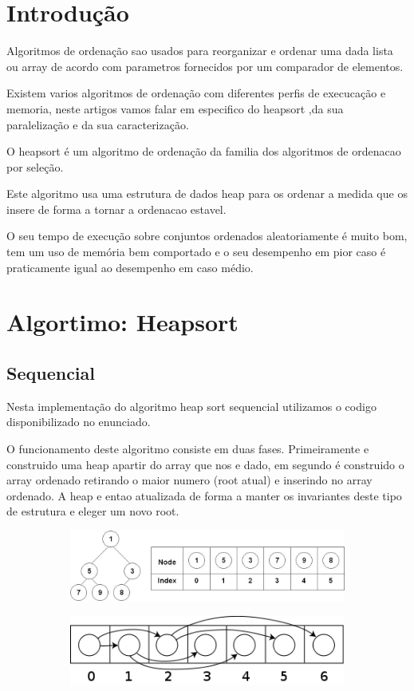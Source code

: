 \documentclass{article}
\begin{document}
\section{Introdução} 
\par Algoritmos de ordenação sao usados para reorganizar e ordenar uma dada lista ou array de acordo com parametros fornecidos por um comparador de elementos.
\par Existem varios algoritmos de ordenação com diferentes perfis de execucação e memoria, neste artigos vamos falar em especifico do heapsort ,da sua paralelização e da sua caracterização.
\par O heapsort é um algoritmo de ordenação da familia dos algoritmos de ordenacao por seleção. 
\par Este algoritmo usa uma estrutura de dados heap para os ordenar a medida que os insere de forma a tornar a ordenacao estavel. 
\par O seu tempo de execução sobre conjuntos ordenados aleatoriamente é muito bom, tem um uso de memória bem comportado e o seu desempenho em pior caso é praticamente igual ao desempenho em caso médio.

\section{Algortimo: Heapsort} 

\subsection{Sequencial}
Nesta implementação do algoritmo heap sort sequencial utilizamos o codigo disponibilizado no enunciado. 
\par  O funcionamento deste algoritmo consiste em duas fases. Primeiramente e construido uma heap apartir do array  que nos e dado, em segundo é construido o array ordenado retirando o maior numero (root atual) e inserindo no array ordenado. A heap e entao atualizada de forma a manter os invariantes deste tipo de estrutura e eleger um novo root.

\begin{figure}[!htb]
  \centering
  \begin{subfigure}{.5\textwidth}
    \centering
    \includegraphics[width=.8\linewidth]{Binary_Heap_with_Array_Implementation.JPG}
  \end{subfigure}%
  \begin{subfigure}{.5\textwidth}
    \centering
    \includegraphics[width=.8\linewidth]{370px-Binary_tree_in_array.png}
  \end{subfigure}
\end{figure}
\end{document}
